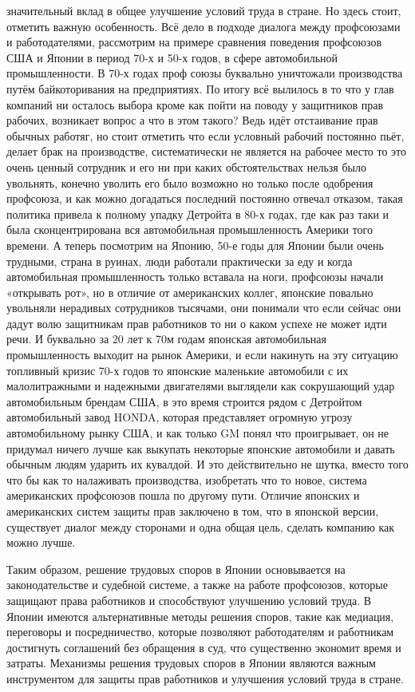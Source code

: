   значительный вклад в общее улучшение условий труда в стране. Но здесь стоит, отметить важную особенность. Всё дело в подходе диалога между профсоюзами и работодателями, рассмотрим на примере сравнения поведения профсоюзов США и Японии в период 70-х и 50-х годов, в сфере автомобильной промышленности. В 70-х годах проф союзы буквально уничтожали производства путём байкоторивания на предприятиях. По итогу всё вылилось в то что у глав компаний ни осталось выбора кроме как пойти на поводу у защитников прав рабочих, возникает вопрос а что в этом такого? Ведь идёт отстаивание прав обычных работяг, но стоит отметить что если условный рабочий постоянно пьёт, делает брак на производстве, систематически не является на рабочее место то это очень ценный сотрудник и его ни при каких обстоятельствах нельзя было увольнять, конечно уволить его было возможно но только после одобрения профсоюза, и как можно догадаться последний постоянно отвечал отказом, такая политика привела к полному упадку Детройта в 80-х годах, где как раз таки и была сконцентрирована вся автомобильная промышленность Америки того времени. А теперь посмотрим на Японию, 50-е годы для Японии были очень трудными, страна в руинах, люди работали практически за еду и когда автомобильная промышленность только вставала на ноги, профсоюзы начали «открывать рот», но в отличие от американских коллег, японские повально увольняли нерадивых сотрудников тысячами, они понимали что если сейчас они дадут волю защитникам прав работников то ни о каком успехе не может идти речи. И буквально за 20 лет к 70м годам японская автомобильная промышленность выходит на рынок Америки, и если накинуть на эту ситуацию топливный кризис 70-х годов то японские маленькие автомобили с их малолитражными и надежными двигателями выглядели как сокрушающий удар автомобильным брендам США, в это время строится рядом  с Детройтом автомобильный завод HONDA, которая представляет огромную угрозу автомобильному рынку США, и как только GM понял что проигрывает, он не придумал ничего лучше как выкупать некоторые японские автомобили и давать обычным людям ударить их кувалдой. И это действительно не шутка, вместо того что бы как то налаживать производства, изобретать что то новое, система американских профсоюзов пошла по другому пути. Отличие японских и американских систем защиты прав заключено в том, что в японской версии, существует диалог между сторонами и одна общая цель, сделать компанию как можно лучше.

Таким образом, решение трудовых споров в Японии основывается на законодательстве и судебной системе, а также на работе профсоюзов, которые защищают права работников и способствуют улучшению условий труда. В Японии имеются альтернативные методы решения споров, такие как медиация, переговоры и посредничество, которые позволяют работодателям и работникам достигнуть соглашений без обращения в суд, что существенно экономит время и затраты. Механизмы решения трудовых споров в Японии являются важным инструментом для защиты прав работников и улучшения условий труда в стране.
